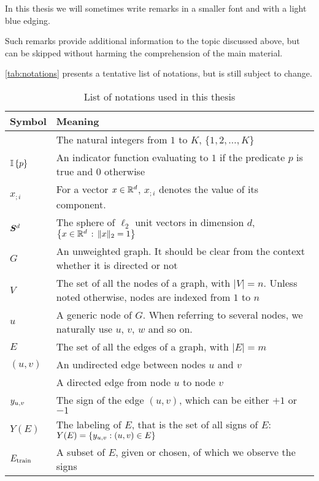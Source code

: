 In this thesis we will sometimes write remarks in a smaller font and with a light blue edging.
\begin{aside}
  Such remarks provide additional information to the topic discussed above, but can be skipped
  without harming the comprehension of the main material.
\end{aside}

\autoref{tab:notations} presents a tentative list of notations, but is still subject to change.

\begin{table*}[thpb]
\begin{adjustwidth}{-2cm}{}
  \centering
  \caption{List of notations used in this thesis}\label{tab:notations}%
  \vspace{-.5\baselineskip}
  \begin{tabulary}{179mm}{LL}
    \toprule
    Symbol & Meaning \\
    \midrule
    \rangek{} & The natural integers from $1$ to $K$, \ie{} $\{1, 2, \ldots, K \}$ \\
    $\mathbb{I}\left\{{p}\right\}$ & An indicator function evaluating to $1$ if the predicate $p$ is true and $0$ otherwise \\
    $x_{;i}$ & For a vector $x\in \mathbb{R}^d$, $x_{;i}$ denotes the value of its \ith{} component. \\
    $\bm{S}^d{}$ & The sphere of $\ell_2$ unit vectors in dimension $d$, \ie{} $\left\{ {x \in
    \mathbb{R}^d} \,:\, {\|x\|_2 = 1} \right\}$ \\
    $G$ & An unweighted graph. It should be clear from the context whether it is directed or not \\
    $V$ & The set of all the nodes of a graph, with $|V|=n$. Unless noted otherwise, nodes are indexed from $1$ to $n$ \\
    $u$ & A generic node of $G$. When referring to several nodes, we naturally use $u$, $v$, $w$ and so on. \\
    $E$ & The set of all the edges of a graph, with $|E|=m$ \\
    $(u,v)$ & An undirected edge between nodes $u$ and $v$ \\
    \euv{} & A directed edge from node $u$ to node $v$ \\
    $y_{u, v}{}$ & The sign of the edge $(u,v)$, which can be either $+1$ or $-1$ \\
    $Y(E)$ & The labeling of $E$, that is the set of all signs of $E$: $Y(E) = \{y_{u, v} : (u,v)\in E\}$ \\
    $E_{\mathrm{train}}$ & A subset of $E$, given or chosen, of which we observe the signs \\

\end{tabulary}
\end{adjustwidth}
\end{table*}
